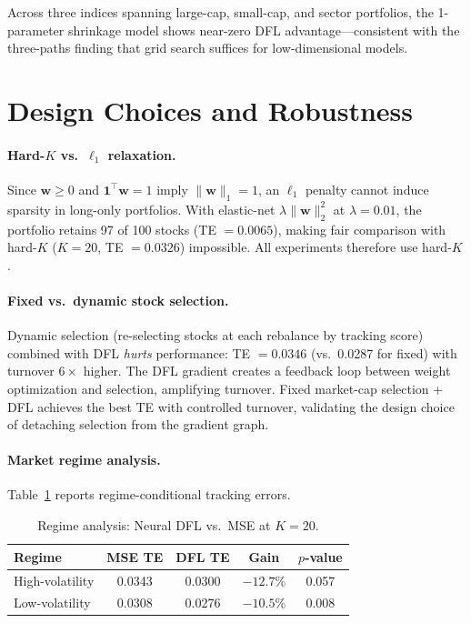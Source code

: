 \documentclass[letterpaper]{article}
\newcommand{\bw}{\mathbf{w}}
\begin{document}
Across three indices spanning large-cap, small-cap, and sector portfolios, the 1-parameter shrinkage model shows near-zero DFL advantage---consistent with the three-paths finding that grid search suffices for low-dimensional models.

\section{Design Choices and Robustness}
\label{app:design}

\paragraph{Hard-$K$ vs.\ $\ell_1$ relaxation.}
Since $\bw \geq 0$ and $\mathbf{1}^\top \bw = 1$ imply $\|\bw\|_1 = 1$, an $\ell_1$ penalty cannot induce sparsity in long-only portfolios. With elastic-net $\lambda\|\bw\|_2^2$ at $\lambda = 0.01$, the portfolio retains 97 of 100 stocks (TE $= 0.0065$), making fair comparison with hard-$K$ ($K{=}20$, TE $= 0.0326$) impossible. All experiments therefore use hard-$K$.

\paragraph{Fixed vs.\ dynamic stock selection.}
Dynamic selection (re-selecting stocks at each rebalance by tracking score) combined with DFL \emph{hurts} performance: TE $= 0.0346$ (vs.\ 0.0287 for fixed) with turnover $6\times$ higher. The DFL gradient creates a feedback loop between weight optimization and selection, amplifying turnover. Fixed market-cap selection + DFL achieves the best TE with controlled turnover, validating the design choice of detaching selection from the gradient graph.

\paragraph{Market regime analysis.}
Table~\ref{tab:regime} reports regime-conditional tracking errors.

\begin{table}[h]
\centering
\caption{Regime analysis: Neural DFL vs.\ MSE at $K = 20$.}
\label{tab:regime}
\small
\begin{tabular}{@{}lcccc@{}}
\toprule
Regime & MSE TE & DFL TE & Gain & $p$-value \\
\midrule
High-volatility & 0.0343 & 0.0300 & $-12.7\%$ & 0.057 \\
Low-volatility  & 0.0308 & 0.0276 & $-10.5\%$ & 0.008 \\
\bottomrule
\end{tabular}
\end{table}
\end{document}
